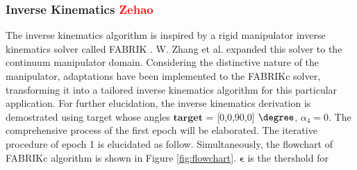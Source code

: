 \subsubsection{Inverse Kinematics \textcolor{red}{Zehao}}
The inverse kinematics algorithm is inspired by a rigid manipulator inverse kinematics solver called FABRIK 
\cite{fabrik}. W. Zhang et al.\cite{fabrikc} expanded this solver to the continuum manipulator domain. Considering 
the distinctive nature of the manipulator, adaptations have been implemented to the FABRIKc solver, transforming it 
into a tailored inverse kinematics algorithm for this particular application. For further elucidation, the inverse 
kinematics derivation is demostrated using target whose angles $\boldsymbol{target}$ = [0,0,90,0] $\degree$, 
$\alpha_4 = 0$. The comprehensive process of the first epoch will be elaborated. The iterative procedure of epoch 1 
is elucidated as follow. Simultaneously, the flowchart of FABRIKc algorithm is shown in Figure \ref{fig:flowchart}. 
$\boldsymbol{\epsilon}$ is the thershold for \\
